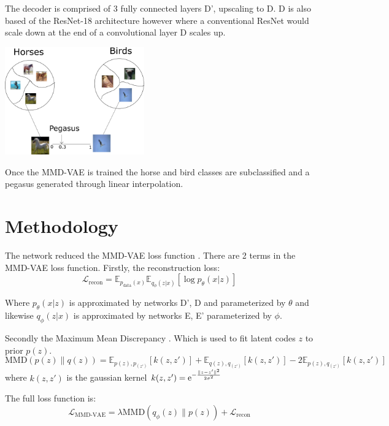 \documentclass{article}
\begin{document}
The decoder is comprised of 3 fully connected layers D', upscaling to D. D is also based of the ResNet-18 architecture however where a conventional ResNet would scale down at the end of a convolutional layer D scales up.



\begin{center}
    \includegraphics[width=0.45\textwidth]{figures/clustering.png}
\end{center}

Once the MMD-VAE is trained the horse and bird classes are subclassified and a pegasus generated through linear interpolation.

\section{Methodology}
The network reduced the MMD-VAE loss function \cite{infovae}. 
There are 2 terms in the MMD-VAE loss function. Firstly, the reconstruction loss:
\begin{equation}
    \mathcal{L}_{\textrm{recon}} = \mathbb{E}_{p_{\textrm{data}}(x)} \mathbb{E}_{q_\phi (z|x)} [\log p_\theta(x|z)]
\end{equation}

Where $p_\theta(x|z)$ is approximated by networks D', D and parameterized by $\theta$ and likewise $q_\phi(z|x)$ is approximated by networks E, E' parameterized by $\phi$.


Secondly the Maximum Mean Discrepancy \cite{mmd}. Which is used to fit latent codes $z$ to prior $p(z)$.
\begin{equation}
    \textrm{MMD}(p(z) \lVert q(z)) = \mathbb{E}_{p(z), p_(z')}[k(z, z')] + \mathbb{E}_{q(z), q_(z')}[k(z, z')] - 2 \mathbb{E}_{p(z), q_(z')}[k(z, z')]
\end{equation}
where $k(z, z')$ is the gaussian kernel $k(z, z')={\rm e}^{-\frac{\lVert z-z' \rVert^2}{2\sigma^2}}$

The full loss function is:
\begin{equation}
    \mathcal{L}_\textrm{MMD-VAE} = \lambda \textrm{MMD}(q_\phi (z) \lVert p(z)) + \mathcal{L}_{\textrm{recon}}
\end{equation}
\end{document}
